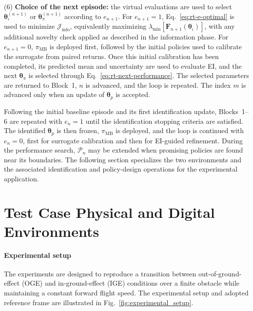 \documentclass[journal]{IEEEtran}
\begin{document}
(6) \textbf{Choice of the next episode:} the virtual evaluations are used to select $\boldsymbol{\theta}_\iota^{(n+1)}$ or $\boldsymbol{\theta}_\pi^{(n+1)}$ according to $e_{n+1}$. For $e_{n+1}=1$, Eq.~\eqref{eq:rt-e-optimal} is used to minimize $\mathcal J_{\mathrm{info}}$, equivalently maximizing $\lambda_{\min}[\mathbf F_{n+1}(\boldsymbol{\theta}_\iota)]$, with any additional novelty check applied as described in the information phase. For $e_{n+1}=0$, $\pi_{\mathrm{MB}}$ is deployed first, followed by the initial policies used to calibrate the surrogate from paired returns. Once this initial calibration has been completed, its predicted mean and uncertainty are used to evaluate EI, and the next $\boldsymbol{\theta}_\pi$ is selected through Eq.~\eqref{eq:rt-next-performance}. The selected parameters are returned to Block~1, $n$ is advanced, and the loop is repeated. The index $m$ is advanced only when an update of $\boldsymbol{\theta}_p$ is accepted.

Following the initial baseline episode and its first identification update, Blocks~1--6 are repeated with $e_n=1$ until the identification stopping criteria are satisfied. The identified $\boldsymbol{\theta}_p$ is then frozen, $\pi_{\mathrm{MB}}$ is deployed, and the loop is continued with $e_n=0$, first for surrogate calibration and then for EI-guided refinement. During the performance search, $\mathcal P_n$ may be extended when promising policies are found near its boundaries. The following section specializes the two environments and the associated identification and policy-design operations for the experimental application.

\section{Test Case Physical and Digital Environments}
\label{sec:setup}
\paragraph*{Experimental setup}
The experiments are designed to reproduce a transition between out-of-ground-effect (OGE) and in-ground-effect (IGE) conditions over a finite obstacle while maintaining a constant forward flight speed. The experimental setup and adopted reference frame are illustrated in Fig.~\ref{fig:experimental_setup}.
\end{document}
